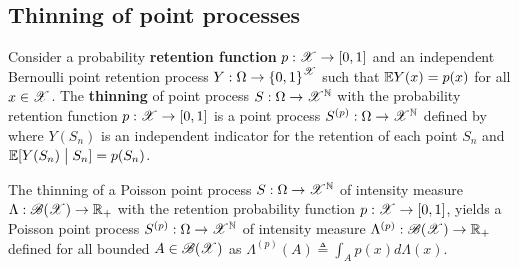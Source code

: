\documentclass[a4paper,english,10pt]{article}
\begin{document}
\subsection{Thinning of point processes}
\begin{defn}
Consider a probability \textbf{retention function} $p: \mathscr{X} \to [0,1]$ and an independent Bernoulli point retention process $Y:\Omega \to \left\{0,1\right\}^{\mathscr{X}}$ such that $\mathbb{E} Y(x) = p(x)$ for all $x \in \mathscr{X}$. 
The \textbf{thinning} of point process $S: \Omega \to \mathscr{X}^{\mathbb{N}}$ with the probability retention function $p: \mathscr{X} \to [0,1]$ is a point process  $S^{(p)}: \Omega \to \mathscr{X}^{\mathbb{N}}$ defined by  
where $Y(S_n)$ is an independent indicator for the retention of each point $S_n$ and $\mathbb{E}[Y(S_n)\; \big\vert \; S_n] = p(S_n)$. 
\end{defn}
\begin{thm}
The thinning of a Poisson point process $S:\Omega\to\mathscr{X}^{\mathbb{N}}$ of intensity measure $\Lambda:\mathscr{B}(\mathscr{X})\to\mathbb{R}_+$ with the retention probability function $p:\mathscr{X}\to[0,1]$,  
yields a Poisson point process $S^{(p)}:\Omega\to\mathscr{X}^{\mathbb{N}}$ of intensity measure $\Lambda^{(p)}:\mathscr{B}(\mathscr{X})\to\mathbb{R}_+$ defined for all bounded $A \in \mathscr{B}(\mathscr{X})$ as 
$
\Lambda^{(p)}(A) \triangleq \int_A p(x) d\Lambda(x).
$
\end{thm}
\end{document}
